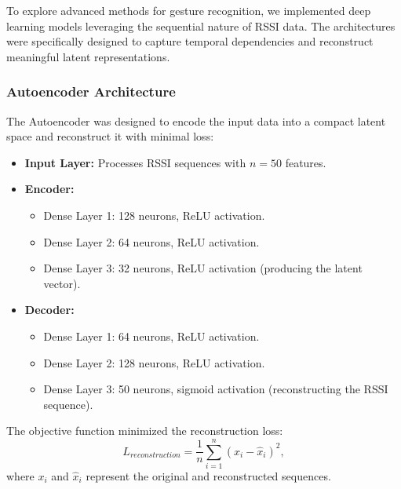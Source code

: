 \documentclass[10pt,twocolumn,letterpaper]{article}
\begin{document}
To explore advanced methods for gesture recognition, we implemented deep learning models leveraging the sequential nature of RSSI data. The architectures were specifically designed to capture temporal dependencies and reconstruct meaningful latent representations.

\subsubsection{Autoencoder Architecture}
The Autoencoder was designed to encode the input data into a compact latent space and reconstruct it with minimal loss:
\begin{itemize}
    \item \textbf{Input Layer:} Processes RSSI sequences with \(n=50\) features.
    \item \textbf{Encoder:}
        \begin{itemize}
            \item Dense Layer 1: 128 neurons, ReLU activation.
            \item Dense Layer 2: 64 neurons, ReLU activation.
            \item Dense Layer 3: 32 neurons, ReLU activation (producing the latent vector).
        \end{itemize}
    \item \textbf{Decoder:}
        \begin{itemize}
            \item Dense Layer 1: 64 neurons, ReLU activation.
            \item Dense Layer 2: 128 neurons, ReLU activation.
            \item Dense Layer 3: 50 neurons, sigmoid activation (reconstructing the RSSI sequence).
        \end{itemize}
\end{itemize}

The objective function minimized the reconstruction loss:
\begin{equation}
    L_{reconstruction} = \frac{1}{n} \sum_{i=1}^n \left(x_i - \hat{x}_i\right)^2,
\end{equation}
where \(x_i\) and \(\hat{x}_i\) represent the original and reconstructed sequences.
\end{document}

